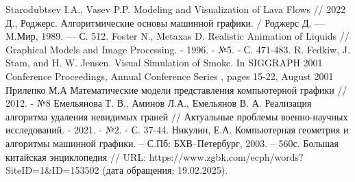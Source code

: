 \begin{thebibliography}{}
	 Starodubtsev I.A., Vasev P.P. Modeling and Visualization of Lava Flows // 2022
	 Д., Роджерс. Алгоритмические основы машинной графики. / Роджерс Д.
	— M.Мир, 1989. — С. 512. 
	 Foster N., Metaxas D. Realistic Animation of Liquids // Graphical Models and Image Processing. - 1996. - №5. - С. 471-483.
	R. Fedkiw, J. Stam, and H. W. Jensen. Visual Simulation of Smoke. In SIGGRAPH 2001 Conference Proceedings, Annual Conference Series , pages 15-22, August 2001
	 Прилепко М.А Математические модели представления компьютерной графики // 2012. - №8
	 Емельянова Т. В., Аминов Л.А., Емельянов В. А. Реализация алгоритма удаления невидимых граней // Актуальные проблемы военно-научных исследований. - 2021. - №2. - С. 37-44.
	 Никулин, Е.А. Компьютерная геометрия и алгоритмы машинной
	графики. – С.Пб: БХВ–Петербург, 2003. – 560с. 
	 Большая китайская энциклопедия // URL: https://www.zgbk.com/ecph/words?SiteID=1\&ID=153502 (дата обращения: 19.02.2025).
	
\end{thebibliography}

